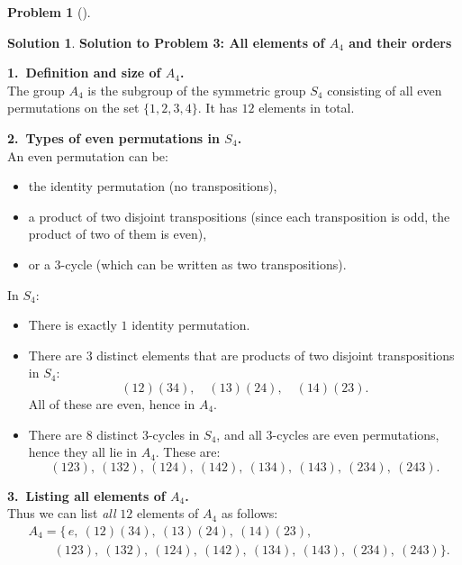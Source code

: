 \documentclass[12pt]{article}
\theoremstyle{definition} %
\newtheorem{solution}{Solution}
\newtheorem{problem}{Problem}
\theoremstyle{plain} %
\begin{document}
\begin{problem}[]
    
\end{problem}
\begin{solution}
    \textbf{Solution to Problem 3: All elements of $A_4$ and their orders}

    \bigskip
    
    \noindent
    \textbf{1.\ Definition and size of $A_4$.}\\
    The group $A_4$ is the subgroup of the symmetric group $S_4$ consisting of all even permutations on the set $\{1,2,3,4\}$.  It has $12$ elements in total.
    
    \bigskip
    
    \noindent
    \textbf{2.\ Types of even permutations in $S_4$.}\\
    An even permutation can be:
    \begin{itemize}
    \item the identity permutation (no transpositions),
    \item a product of two disjoint transpositions (since each transposition is odd, the product of two of them is even),
    \item or a 3-cycle (which can be written as two transpositions).
    \end{itemize}
    In $S_4$:
    \begin{itemize}
    \item There is exactly $1$ identity permutation.
    \item There are $3$ distinct elements that are products of two disjoint transpositions in $S_4$:
    \[
    (12)(34),\quad (13)(24),\quad (14)(23).
    \]
    All of these are even, hence in $A_4$.
    \item There are $8$ distinct 3-cycles in $S_4$, and all 3-cycles are even permutations, hence they all lie in $A_4$.  These are:
    \[
    (123),\ (132),\ (124),\ (142),\ (134),\ (143),\ (234),\ (243).
    \]
    \end{itemize}
    
    \bigskip
    
    \noindent
    \textbf{3.\ Listing all elements of $A_4$.}\\
    Thus we can list \emph{all} $12$ elements of $A_4$ as follows:
    \[
    \begin{aligned}
    &A_4 = \{\, e,\ (12)(34),\ (13)(24),\ (14)(23),\\
    &\qquad (123),\ (132),\ (124),\ (142),\ (134),\ (143),\ (234),\ (243)\}.
    \end{aligned}
    \]
    

\end{solution}
\end{document}
